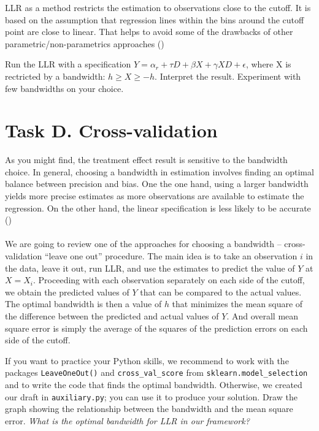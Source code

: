  LLR as a method restricts the estimation to observations close to the cutoff. It is based on the assumption that  regression lines within the bins around the cutoff point are close to linear. That helps to avoid some of the drawbacks of other parametric/non-parametrics approaches (\cite{Lee.2010a})

\begin{boenumerate}

\item Run the LLR with a specification $Y = \alpha_r + \tau D + \beta X + \gamma X D + \epsilon$, where X is rectricted by a bandwidth: $h \geq X \geq -h$. Interpret the result. Experiment with few bandwidths on your choice.

\end{boenumerate}

\section*{Task D. Cross-validation}

As you might find, the treatment effect result is sensitive to the bandwidth choice. In general, choosing a bandwidth in estimation involves finding an optimal balance between precision and bias. One the one hand, using a larger bandwidth yields more precise estimates as more observations are available to estimate the regression. On the other hand, the linear specification is less likely to be accurate (\cite{Lee.2010a})\\
\\
We are going to review one of the approaches for choosing a bandwidth --  cross-validation “leave one out” procedure. The main idea is to take an observation $i$ in the data, leave it out, run LLR, and use the estimates to predict the value of $Y$ at $X = X_i$.  Proceeding with each observation separately on each side of the cutoff, we obtain the predicted values of $Y$ that can be compared to the actual values. The optimal bandwidth is then a value of $h$ that minimizes the mean square of the difference between the predicted and actual values of $Y$. And overall mean square error is simply the average of the squares of the prediction errors  on each side of the cutoff.

\begin{boenumerate}

\item If you want to practice your Python skills, we recommend to work with the packages \texttt{LeaveOneOut()} and \texttt{cross\_val\_score} from \texttt{sklearn.model\_selection} and to write the code that finds the optimal bandwidth. Otherwise, we created our draft in \texttt{auxiliary.py}; you can use it to produce your solution. Draw the graph showing the relationship between the bandwidth and the mean square error. \emph{What is the optimal bandwidth for LLR in our framework?}

\end{boenumerate}





